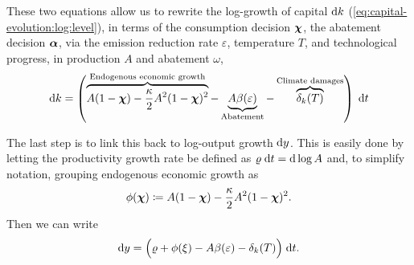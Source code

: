 \documentclass[../../main.tex]{subfiles}
\begin{document}
These two equations allow us to rewrite the log-growth of capital $\mathrm{d}k$ (\ref{eq:capital-evolution:log:level}), in terms of the consumption decision $\bm{\chi}$, the abatement decision $\bm{\alpha}$, via the emission reduction rate $\varepsilon$, temperature $T$, and technological progress, in production $A$ and abatement $\omega$, \begin{equation} \label{eq:capital-evolution:log:growth}
    \mathrm{d}k = \left( \overbrace{A (1 - \bm{\chi}) - \frac{\kappa}{2} A^2 (1 - \bm{\chi})^2}^{\text{Endogenous economic growth}} - \underbrace{A \beta(\varepsilon)}_{\text{Abatement}} - \overbrace{\delta_k(T)}^{\text{Climate damages}} \right) \; \mathrm{d}t
\end{equation} 

The last step is to link this back to log-output growth $\mathrm{d}y$. This is easily done by letting the productivity growth rate be defined as $\varrho \; \mathrm{d}t = \mathrm{d}\log A$ and, to simplify notation, grouping endogenous economic growth as \begin{equation}
    \phi(\bm{\chi}) \coloneqq A (1 - \bm{\chi}) - \frac{\kappa}{2} A^2 (1 - \bm{\chi})^2.
\end{equation} Then we can write \begin{equation} \label{eq:output-evolution:log}
    \mathrm{d}y = \Big(\varrho + \phi(\xi) - A \beta(\varepsilon) - \delta_k(T) \Big) \; \mathrm{d}t.
\end{equation}
\end{document}
